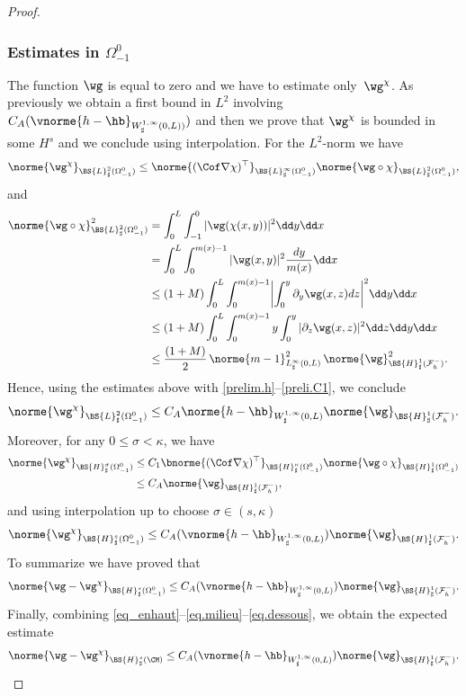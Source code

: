 \begin{proof}
\subsubsection*{Estimates in $\Omega_{-1}^{0}$} The function $\wg$ is equal to zero and we have to estimate only~$\wg^\chi$. As previously we obtain a first bound in $L^{2}$ involving $C_A(\vnorme{h-\hb}_{W^{1,\infty}_{\sharp}(0,L))})$ and then we prove that $\wg^\chi$ is bounded in some $H^{s}$ and we conclude using interpolation. For the $L^{2}$-norm we have
\[
\norme{\wg^\chi}_{\BS{L}^{2}_{\sharp}(\Omega_{-1}^{0})}\leq \norme{(\Cof\nabla\chi)^{\top}}_{\BS{L}^{\infty}_{\sharp}(\Omega_{-1}^{0})}\norme{\wg\circ\chi}_{\BS{L}^{2}_{\sharp}(\Omega_{-1}^{0})},
\]
and
\[
\begin{aligned}
\norme{\wg\circ\chi}^2_{\BS{L}^{2}_{\sharp}(\Omega_{-1}^{0})}&=\int_{0}^{L}\int_{-1}^{0}\vert \wg(\chi(x,y))\vert^{2}\dd y\dd x&{}\\
&=\int_{0}^{L}\int_{0}^{m(x)-1}\vert \wg(x,y)\vert^{2}\frac{dy}{m(x)}\dd x\\
&\leq (1+M)\int_{0}^{L}\int_{0}^{m(x)-1}\biggl\vert\int_{0}^{y}\partial_y\wg(x,z)dz\biggr\vert^{2}\dd y\dd x\\
&\leq (1+M)\int_{0}^{L}\int_{0}^{m(x)-1}y\int_{0}^{y}\vert\partial_z\wg(x,z)\vert^{2}\dd z\dd y\dd x\\
&\leq \frac{(1+M)}{2}\,\norme{m-1}_{L^{\infty}_{\sharp}(0,L)}^{2}\,\norme{\wg}_{\BS{H}^{1}_{\sharp}(\mathcal{F}^{-}_{h})}^{2}.
\end{aligned}
\]
Hence, using the estimates above with \eqref{prelim.h}--\eqref{preli.C1}, we conclude
\[\norme{\wg^\chi}_{\BS{L}^{2}_{\sharp}(\Omega_{-1}^{0})}\leq C_A\norme{h-\hb}_{W^{1,\infty}_{\sharp}(0,L)}\norme{\wg}_{\BS{H}^{1}_{\sharp}(\mathcal{F}^{-}_{h})}.
\]
Moreover, for any $0\leq \sigma<\kappa$, we have
\[
\begin{aligned}
\norme{\wg^\chi}_{\BS{H}^{\sigma}_{\sharp}(\Omega_{-1}^{0})}&{}\leq C_{1}\bnorme{(\Cof\nabla\chi)^{\top}}_{\BS{H}^{\kappa}_{\sharp}(\Omega_{-1}^{0})}\norme{\wg\circ\chi}_{\BS{H}^{1}_{\sharp}(\Omega_{-1}^{0})}\\
&\leq C_A\norme{\wg}_{\BS{H}^{1}_{\sharp}(\mathcal{F}^{-}_{h})},
\end{aligned}
\]
and using interpolation up to choose $\sigma \in (s,\kappa)$
\[\norme{\wg^\chi}_{\BS{H}^{s}_{\sharp}(\Omega_{-1}^{0})}\leq C_A(\vnorme{h-\hb}_{W^{1,\infty}_{\sharp}(0,L)})\norme{\wg}_{\BS{H}^{1}_{\sharp}(\mathcal{F}^{-}_{h})}.\]
To summarize we have proved that
\begin{equation} \label{eq.dessous}
\norme{\wg-\wg^\chi}_{\BS{H}^{s}_{\sharp}(\Omega_{-1}^0)}\leq C_A(\vnorme{h-\hb}_{W^{1,\infty}_{\sharp}(0,L)})\norme{\wg}_{\BS{H}^{1}_{\sharp}(\mathcal{F}^{-}_{h})}.
\end{equation}
Finally, combining \eqref{eq_enhaut}--\eqref{eq.milieu}--\eqref{eq.dessous}, we obtain the expected estimate
\begin{equation} \label{eq.total}
\norme{\wg-\wg^\chi}_{\BS{H}^{s}_{\sharp}(\CM)}\leq C_A(\vnorme{h-\hb}_{W^{1,\infty}_{\sharp}(0,L)})\norme{\wg}_{\BS{H}^{1}_{\sharp}(\mathcal{F}^{-}_{h})}.
\end{equation}


\end{proof}
